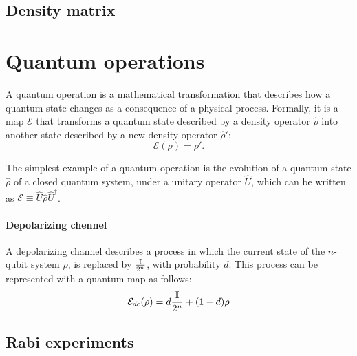 \subsection{Density matrix}
\section{Quantum operations}
A quantum operation is a mathematical transformation that describes how a quantum state changes as a consequence of a physical process. Formally, it is a map $\mathcal{E}$ that transforms a quantum state described by a density operator $\hat{\rho}$ into another state described by a new density operator $\hat{\rho}'$:
\begin{equation}
    \mathcal{E}(\rho) = \rho'\label{eq:quantum_map}.
\end{equation}

The simplest example of a quantum operation is the evolution of a quantum state $\hat{\rho}$ of a closed quantum system, under a unitary operator $\hat{U}$, which can be written as $\mathcal{E} \equiv \hat{U} \hat{\rho} \hat{U}^{\dagger}$.

\paragraph{Depolarizing chennel}
A depolarizing channel describes a process in which the current state of the $n$-qubit system $\rho$, is replaced by $\frac{\mathbb{I}}{2^n}$, with probability $d$. This process can be represented with a quantum map as follows:
\begin{equation}
    \mathcal{E}_{dc}(\rho) = d\frac{\mathbb{I}}{2^n}+(1-d)\rho\label{eq:depolarizing_channel}
\end{equation} 


\subsection{Rabi experiments}


